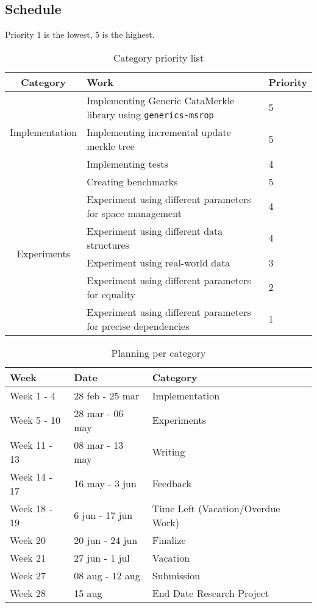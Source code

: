 
\newpage
\subsection{Schedule}

Priority 1 is the lowest, 5 is the highest.
\begin{table}[H]
    \setlength{\tabcolsep}{8pt}
    \centering
    \small
    \bigskip
    \begin{tabular}{|c|l|l|}
        \hline
        Category & Work & Priority \\
        \hline
        \multirow{3}{7em}{Implementation} & Implementing Generic CataMerkle library using \texttt{generics-msrop} & 5 \\
         & Implementing incremental update merkle tree & 5 \\
         & Implementing tests & 4 \\
        \hline
        \multirow{6}{7em}{Experiments} & Creating benchmarks & 5 \\
         & Experiment using different parameters for space management & 4 \\
         & Experiment using different data structures & 4 \\
         & Experiment using real-world data & 3 \\
         & Experiment using different parameters for equality & 2 \\
         & Experiment using different parameters for precise dependencies & 1 \\
        \hline
    \end{tabular}
\caption{Category priority list}
\label{table:priorities}
\end{table}

\begin{table}[H]
\setlength{\tabcolsep}{8pt}
\centering
\small
\bigskip
\begin{tabular}{|l|l|l|}
    \hline
    Week & Date & Category \\
    \hline
    Week 1 - 4 & 28 feb - 25 mar & Implementation \\
    \hline
    Week 5 - 10 & 28 mar - 06 may & Experiments \\
    \hline
    Week 11 - 13 & 08 mar - 13 may & Writing \\
    \hline
    Week 14 - 17 & 16 may - 3 jun & Feedback \\
    \hline
    Week 18 - 19 & 6 jun - 17 jun & Time Left (Vacation/Overdue Work) \\
    \hline
    Week 20 & 20 jun - 24 jun & Finalize \\
    \hline
    Week 21 & 27 jun - 1 jul & Vacation \\
    \hline
    Week 27 & 08 aug - 12 aug & Submission \\
    \hline 
    Week 28 & 15 aug & End Date Research Project  \\
    \hline
\end{tabular}
\caption{Planning per category}
\label{table:planning}
\end{table}